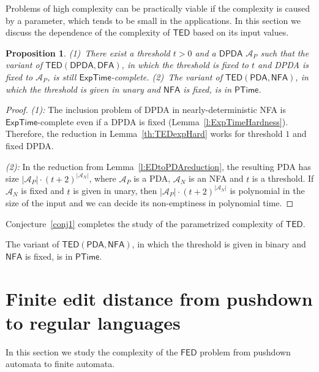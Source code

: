 \documentclass{CSML}
\newcommand{\aut}{\mathcal{A}}
\newcommand{\PTIME}{\textsf{PTime}}
\newcommand{\EXPTIME}{\textsf{ExpTime}}
\newcommand{\DFA}{\mathsf{DFA}}
\newcommand{\NFA}{\mathsf{NFA}}
\newcommand{\PDA}{\mathsf{PDA}}
\newcommand{\DPDA}{\mathsf{DPDA}}
\newcommand{\TED}{\mathsf{TED}}
\newcommand{\FED}{\mathsf{FED}}
\newtheorem{proposition}[theorem]{Proposition}
\begin{document}
Problems of high complexity can be practically viable if the complexity
is caused by a parameter, which tends to be small in the applications. In this section 
we discuss the dependence of the complexity of $\TED$ based on its input values.

\begin{proposition}
(1)~There exist a threshold $t > 0$ and a $\DPDA$ $\aut_P$ such that 
the variant of $\TED(\DPDA, \DFA)$, in which the threshold is fixed to $t$ and DPDA 
is fixed to $\aut_P$, is still $\EXPTIME$-complete.
(2)~The variant of $\TED(\PDA, \NFA)$, in which the threshold is given in unary and 
$\NFA$ is fixed, is in $\PTIME$.
\end{proposition}

\begin{proof}
\noindent\emph{(1):} The inclusion problem of DPDA in nearly-deterministic NFA is
$\EXPTIME$-complete even if a DPDA is fixed (Lemma~\ref{l:ExpTimeHardness}).
Therefore, the reduction in Lemma~\ref{th:TEDexpHard} works for threshold $1$ and fixed DPDA.

\noindent\emph{(2):} In the reduction from Lemma~\ref{l:EDtoPDAreduction}, the resulting PDA has size $|\aut_P|\cdot (t+2)^{|\aut_N|}$, where $\aut_P$ is a PDA, $\aut_N$ is an NFA
and $t$ is a threshold. If $\aut_N$ is fixed and $t$ is given in unary, then $|\aut_P|\cdot (t+2)^{|\aut_N|}$
is polynomial in the size of the input and we can decide its non-emptiness in polynomial time.
\end{proof}

Conjecture~\ref{conj1} completes the study of the parametrized complexity of $\TED$.

\begin{conj}\label{conj1}
The variant of $\TED(\PDA, \NFA)$, in which the threshold is given in binary and 
$\NFA$ is fixed, is in $\PTIME$.
\end{conj}

 

\section{Finite edit distance from pushdown to regular languages}
\makeatletter{}\label{s:FEDPDAtoRegular}
\newcommand{\nonTerm}{T}
\newcommand{\extNon}{B}
\newcommand{\reach}{\textsf{Reach}}


In this section we study the complexity of the $\FED$ problem 
from pushdown automata to finite automata. 
\end{document}
